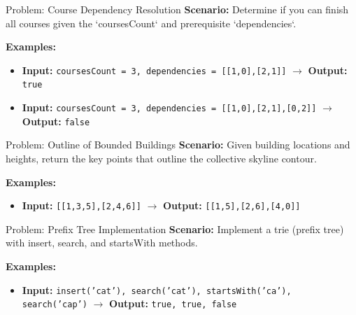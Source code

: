 \begin{frame}[fragile]{Problem: Course Dependency Resolution}
  \textbf{Scenario:}
  Determine if you can finish all courses given the `coursesCount` and prerequisite `dependencies`.
  
  \vspace{0.3cm}
  \textbf{Examples:}
  \begin{itemize}
    \item \textbf{Input:} \texttt{coursesCount = 3, dependencies = [[1,0],[2,1]]} $\rightarrow$ \textbf{Output:} \texttt{true}
    \item \textbf{Input:} \texttt{coursesCount = 3, dependencies = [[1,0],[2,1],[0,2]]} $\rightarrow$ \textbf{Output:} \texttt{false}
  \end{itemize}
\end{frame}

\begin{frame}[fragile]{Problem: Outline of Bounded Buildings}
  \textbf{Scenario:}
  Given building locations and heights, return the key points that outline the collective skyline contour.
  
  \vspace{0.3cm}
  \textbf{Examples:}
  \begin{itemize}
    \item \textbf{Input:} \texttt{[[1,3,5],[2,4,6]]} $\rightarrow$ \textbf{Output:} \texttt{[[1,5],[2,6],[4,0]]}
  \end{itemize}
\end{frame}

\begin{frame}[fragile]{Problem: Prefix Tree Implementation}
  \textbf{Scenario:}
  Implement a trie (prefix tree) with insert, search, and startsWith methods.
  
  \vspace{0.3cm}
  \textbf{Examples:}
  \begin{itemize}
    \item \textbf{Input:} \texttt{insert('cat'), search('cat'), startsWith('ca'), search('cap')} $\rightarrow$ \textbf{Output:} \texttt{true, true, false}
  \end{itemize}
\end{frame}
